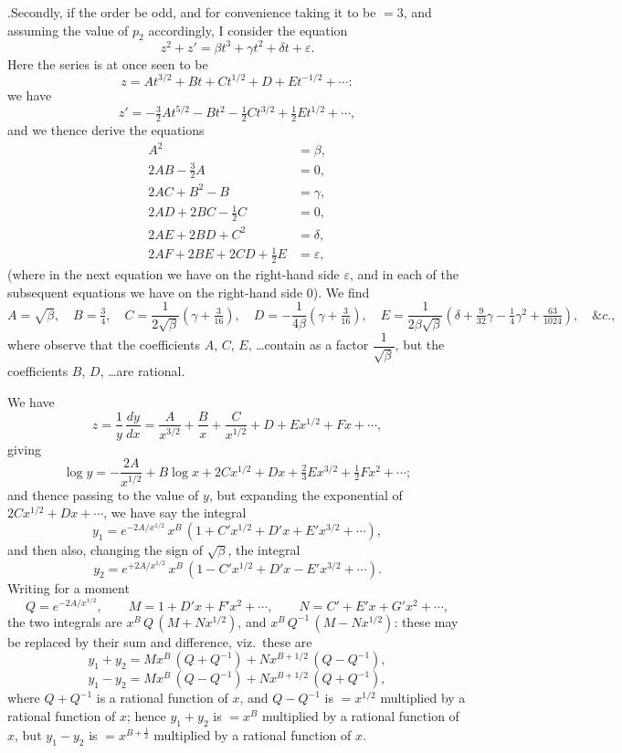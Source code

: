 \documentclass[11pt]{article}
\begin{document}
.\quad Secondly, if the order be odd, and for convenience taking it to be $=3$, and assuming the value of $p_{2}$ accordingly, I consider the equation
\[
z^{2}+z'=\beta t^{3}+\gamma t^{2}+\delta t+\varepsilon.
\]
Here the series is at once seen to be
\[
z = A t^{3/2} + B t + C t^{1/2} + D + E t^{-1/2} + \cdots:
\]
we have
\[
z' = -\tfrac{3}{2}A t^{5/2} - B t^{2} - \tfrac{1}{2}C t^{3/2}
     + \tfrac{1}{2}E t^{1/2} + \cdots,
\]
and we thence derive the equations
\begin{align*}
A^{2} &= \beta, \\
2AB - \tfrac{3}{2}A &= 0, \\
2AC + B^{2} - B &= \gamma, \\
2AD + 2BC - \tfrac{1}{2}C &= 0, \\
2AE + 2BD + C^{2} &= \delta, \\
2AF + 2BE + 2CD + \tfrac{1}{2}E &= \varepsilon,
\end{align*}
(where in the next equation we have on the right-hand side $\varepsilon$, and in each of the subsequent equations we have on the right-hand side $0$). We find
\[
A = \sqrt{\beta},\quad B = \tfrac{3}{4},\quad
C = \frac{1}{2\sqrt{\beta}}\left(\gamma+\tfrac{3}{16}\right),\quad
D = -\frac{1}{4\beta}\left(\gamma+\tfrac{3}{16}\right),\quad
E = \frac{1}{2\beta\sqrt{\beta}}\left(\delta+\tfrac{9}{32}\gamma-\tfrac{1}{4}\gamma^{2}+\tfrac{63}{1024}\right),\quad \&c.,
\]
where observe that the coefficients $A$, $C$, $E$, \ldots contain as a factor $\dfrac{1}{\sqrt{\beta}}$, but the coefficients $B$, $D$, \ldots are rational.

\medskip

\noindent We have
\[
z = \frac{1}{y}\,\frac{dy}{dx} = \frac{A}{x^{3/2}} + \frac{B}{x}
  + \frac{C}{x^{1/2}} + D + Ex^{1/2} + Fx + \cdots,
\]
giving
\[
\log y = -\frac{2A}{x^{1/2}} + B\log x + 2Cx^{1/2} + Dx + \tfrac{2}{3}Ex^{3/2} + \tfrac{1}{2}Fx^{2} + \cdots;
\]
and thence passing to the value of $y$, but expanding the exponential of $2Cx^{1/2} + Dx + \cdots$, we have say the integral
\[
y_{1} = e^{-2A/x^{1/2}}\,x^{B}\,(1 + C'x^{1/2} + D'x + E'x^{3/2} + \cdots),
\]
and then also, changing the sign of $\sqrt{\beta}$, the integral
\[
y_{2} = e^{+2A/x^{1/2}}\,x^{B}\,(1 - C'x^{1/2} + D'x - E'x^{3/2} + \cdots).
\]
Writing for a moment
\[
Q = e^{-2A/x^{1/2}},\qquad M = 1 + D'x + F'x^{2} + \cdots,\qquad
N = C' + E'x + G'x^{2} + \cdots,
\]
the two integrals are $x^{B}\,Q\,(M + N x^{1/2})$, and $x^{B}\,Q^{-1}\,(M - N x^{1/2})$: these may be replaced by their sum and difference, viz.\ these are
\[
y_{1} + y_{2} = M x^{B}\,(Q + Q^{-1}) + N x^{B + 1/2}\,(Q - Q^{-1}),
\]
\[
y_{1} - y_{2} = M x^{B}\,(Q - Q^{-1}) + N x^{B + 1/2}\,(Q + Q^{-1}),
\]
where $Q + Q^{-1}$ is a rational function of $x$, and $Q - Q^{-1}$ is $=x^{1/2}$ multiplied by a rational function of $x$; hence $y_{1} + y_{2}$ is $=x^{B}$ multiplied by a rational function of $x$, but $y_{1} - y_{2}$ is $=x^{B+\frac{1}{2}}$ multiplied by a rational function of $x$.
\end{document}
